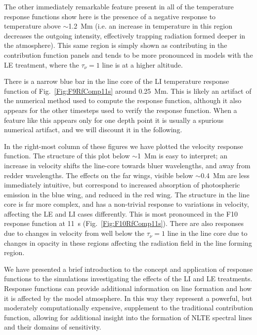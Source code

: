 The other immediately remarkable feature present in all of the temperature response functions show here is the presence of a negative response to temperature above $\sim$\SI{1.2}{\mega\metre} (i.e. an increase in temperature in this region decreases the outgoing intensity, effectively trapping radiation formed deeper in the atmosphere).
This same region is simply shown as contributing in the contribution function panels and tends to be more pronounced in models with the LE treatment, where the $\tau_\nu=1$ line is at a higher altitude.

There is a narrow blue bar in the line core of the LI temperature response function of Fig.~\ref{Fig:F9RfComp11s} around \SI{0.25}{\mega\metre}.
This is likely an artifact of the numerical method used to compute the response function, although it also appears for the other timesteps used to verify the response function.
When a feature like this appears only for one depth point it is usually a spurious numerical artifact, and we will discount it in the following.

In the right-most column of these figures we have plotted the velocity response function.
The structure of this plot below $\sim$\SI{1}{\mega\metre} is easy to interpret; an increase in velocity shifts the line-core towards bluer wavelengths, and away from redder wavelengths.
The effects on the far wings, visible below $\sim$\SI{0.4}{\mega\metre} are less immediately intuitive, but correspond to increased absorption of photospheric emission in the blue wing, and reduced in the red wing.
The structure in the line core is far more complex, and has a non-trivial response to variations in velocity, affecting the LE and LI cases differently.
This is most pronounced in the F10 response function at \SI{11}{\second} (Fig.~\ref{Fig:F10RfComp11s}).
There are also responses due to changes in velocity from well below the $\tau_\nu=1$ line in the line core due to changes in opacity in these regions affecting the radiation field in the line forming region.

We have presented a brief introduction to the concept and application of response functions to the simulations investigating the effects of the LI and LE treatments.
Response functions can provide additional information on line formation and how it is affected by the model atmosphere.
In this way they represent a powerful, but moderately computationally expensive, supplement to the traditional contribution function, allowing for additional insight into the formation of NLTE spectral lines and their domains of sensitivity.

